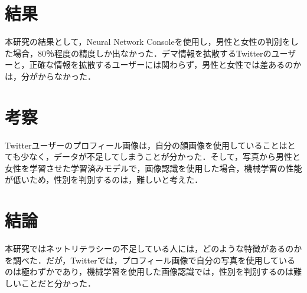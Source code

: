\documentclass[uplatex,twocolumn,dvipdfmx]{jsarticle}
\begin{document}
\section{結果}

本研究の結果として，Neural Network Consoleを使用し，男性と女性の判別をした場合，80％程度の精度しか出なかった．デマ情報を拡散するTwitterのユーザーと，正確な情報を拡散するユーザーには関わらず，男性と女性では差あるのかは，分がからなかった．

\section{考察}

Twitterユーザーのプロフィール画像は，自分の顔画像を使用していることはとても少なく，データが不足してしまうことが分かった．そして，写真から男性と女性を学習させた学習済みモデルで，画像認識を使用した場合，機械学習の性能が低いため，性別を判別するのは，難しいと考えた．

\section{結論}

本研究ではネットリテラシーの不足している人には，どのような特徴があるのかを調べた．だが，Twitterでは，プロフィール画像で自分の写真を使用しているのは極わずかであり，機械学習を使用した画像認識では，性別を判別するのは難しいことだと分かった．

\end{document}
